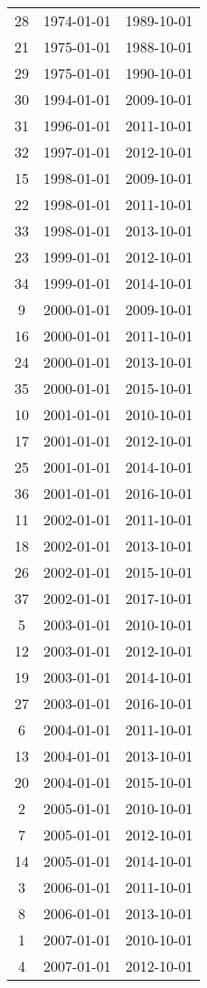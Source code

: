 % 
\begin{tabular}{ccc}
  \hline
  \hline
28 & 1974-01-01 & 1989-10-01 \\ 
  21 & 1975-01-01 & 1988-10-01 \\ 
  29 & 1975-01-01 & 1990-10-01 \\ 
  30 & 1994-01-01 & 2009-10-01 \\ 
  31 & 1996-01-01 & 2011-10-01 \\ 
  32 & 1997-01-01 & 2012-10-01 \\ 
  15 & 1998-01-01 & 2009-10-01 \\ 
  22 & 1998-01-01 & 2011-10-01 \\ 
  33 & 1998-01-01 & 2013-10-01 \\ 
  23 & 1999-01-01 & 2012-10-01 \\ 
  34 & 1999-01-01 & 2014-10-01 \\ 
  9 & 2000-01-01 & 2009-10-01 \\ 
  16 & 2000-01-01 & 2011-10-01 \\ 
  24 & 2000-01-01 & 2013-10-01 \\ 
  35 & 2000-01-01 & 2015-10-01 \\ 
  10 & 2001-01-01 & 2010-10-01 \\ 
  17 & 2001-01-01 & 2012-10-01 \\ 
  25 & 2001-01-01 & 2014-10-01 \\ 
  36 & 2001-01-01 & 2016-10-01 \\ 
  11 & 2002-01-01 & 2011-10-01 \\ 
  18 & 2002-01-01 & 2013-10-01 \\ 
  26 & 2002-01-01 & 2015-10-01 \\ 
  37 & 2002-01-01 & 2017-10-01 \\ 
  5 & 2003-01-01 & 2010-10-01 \\ 
  12 & 2003-01-01 & 2012-10-01 \\ 
  19 & 2003-01-01 & 2014-10-01 \\ 
  27 & 2003-01-01 & 2016-10-01 \\ 
  6 & 2004-01-01 & 2011-10-01 \\ 
  13 & 2004-01-01 & 2013-10-01 \\ 
  20 & 2004-01-01 & 2015-10-01 \\ 
  2 & 2005-01-01 & 2010-10-01 \\ 
  7 & 2005-01-01 & 2012-10-01 \\ 
  14 & 2005-01-01 & 2014-10-01 \\ 
  3 & 2006-01-01 & 2011-10-01 \\ 
  8 & 2006-01-01 & 2013-10-01 \\ 
  1 & 2007-01-01 & 2010-10-01 \\ 
  4 & 2007-01-01 & 2012-10-01 \\ 
   \hline
\end{tabular}
